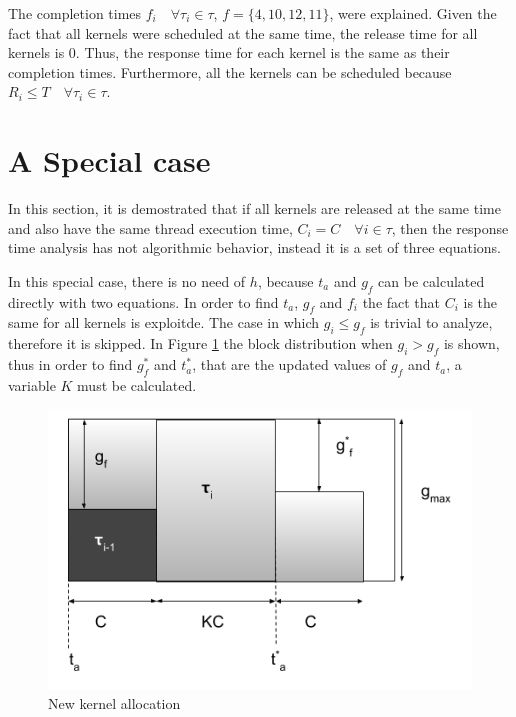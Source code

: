 \documentclass[
  12pt,
  a4paperpaper,
]{report}
\begin{document}
The completion times \(f_i \quad \forall \tau_i \in \tau\), \(f = \{4,10,12,11\}\), were explained.
Given the fact that all kernels were scheduled at the same time, the release time for
all kernels is 0. Thus, the response time for each kernel is the same as
their completion times. 
Furthermore,  all the kernels can be scheduled because \(R_i \leq T \quad \forall \tau_i \in \tau\).

\hypertarget{a-special-case}{%
\section{A Special case}\label{a-special-case}}

In this section, it is demostrated  that if all kernels are released at the
same time and also have the same thread execution time,
\(C_i = C \quad \forall i \in \tau\), then the response time analysis has not
algorithmic behavior, instead it is a set of three equations.

In this special case, there is no need of \(h\), because \(t_a\) and
\(g_f\) can be calculated directly with two equations.
In order to find \(t_a\), \(g_f\) and \(f_i\) the fact that \(C_i\) is the same for all kernels is exploitde. 
The case in which \(g_i \leq g_f\) is trivial to analyze, therefore it is skipped.
In Figure \ref{img:free_blocks_alg} the block
distribution when \(g_i > g_f\) is shown, thus in order to find \(g^{*}_f\) and
\(t^{*}_a\), that are the updated values of \(g_f\) and \(t_a\), a variable \(K\) must be calculated.

\begin{figure}
\centering
\includegraphics{source/figures/free_blocks_alg.png}
\caption{New kernel allocation \label{img:free_blocks_alg}}
\end{figure}
\end{document}

